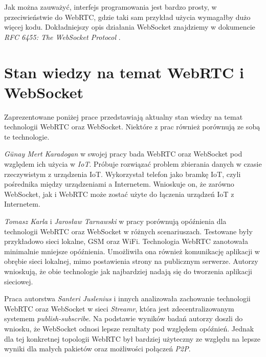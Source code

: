 \documentclass[language=polish,type=master]{aghmodern}
\begin{document}
Jak można zauważyć, interfejs programowania jest bardzo prosty, w przeciwieństwie do WebRTC, gdzie taki sam przykład użycia wymagałby dużo więcej kodu.
Dokładniejszy opis działania WebSocket znajdziemy w dokumencie \emph{RFC 6455: The WebSocket Protocol} \cite{RFC6455}.

\pagebreak

\section{Stan wiedzy na temat WebRTC i WebSocket}
Zaprezentowane poniżej prace przedstawiają aktualny stan wiedzy na temat technologii WebRTC oraz WebSocket.
Niektóre z prac również porównują ze sobą te technologie.

\emph{G{\"u}nay Mert Karadogan} w swojej pracy \cite{websocket_webrtc_iot} bada WebRTC oraz WebSocket pod względem ich użycia w \emph{IoT}\footnotemark{}.
Próbuje rozwiązać problem zbierania danych w czasie rzeczywistym z urządzenia IoT.
Wykorzystał telefon jako bramkę IoT, czyli pośrednika między urządzeniami a Internetem.
Wnioskuje on, że zarówno WebSocket, jak i WebRTC może zostać użyte do łączenia urządzeń IoT z Internetem.

\emph{Tomasz Karla} i \emph{Jarosław Tarnawski} w pracy \cite{websocket_webrtc_realtime} porównują opóźnienia dla technologii WebRTC oraz WebSocket w różnych scenariuszach.
Testowane były przykładowo sieci lokalne, GSM oraz WiFi. Technologia WebRTC zanotowała minimalnie mniejsze opóźnienia.
Umożliwiła ona również komunikację aplikacji w obrębie sieci lokalnej\footnotemark{}, mimo postawienia strony na publicznym serwerze.
Autorzy wnioskują, że obie technologie jak najbardziej nadają się do tworzenia aplikacji sieciowej.

Praca \cite{websocket_webrtc_streamr} autorstwa \emph{Santeri Juslenius} i innych analizowała zachowanie technologii WebRTC oraz WebSocket w sieci \emph{Streamr}, która jest zdecentralizowanym systemem \emph{publish-subscribe}\footnotemark{}.
Na podstawie wyników badań autorzy doszli do wniosku, że WebSocket odnosi lepsze rezultaty pod względem opóźnień.
Jednak dla tej konkretnej topologii WebRTC był bardziej użyteczny ze względu na lepsze wyniki dla małych pakietów oraz możliwości połączeń \emph{P2P}\footnotemark{}.
\end{document}
